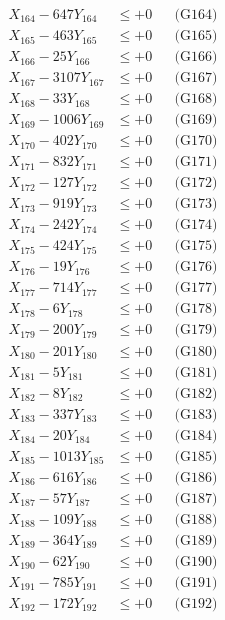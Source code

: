 \documentclass[a4paper,10pt]{article}
\begin{document}
{\begin{align}
X_{164} - 647Y_{164} &\leq +0 && \text{(G164)} \\
X_{165} - 463Y_{165} &\leq +0 && \text{(G165)} \\
X_{166} - 25Y_{166} &\leq +0 && \text{(G166)} \\
X_{167} - 3107Y_{167} &\leq +0 && \text{(G167)} \\
X_{168} - 33Y_{168} &\leq +0 && \text{(G168)} \\
X_{169} - 1006Y_{169} &\leq +0 && \text{(G169)} \\
X_{170} - 402Y_{170} &\leq +0 && \text{(G170)} \\
\allowbreak
X_{171} - 832Y_{171} &\leq +0 && \text{(G171)} \\
X_{172} - 127Y_{172} &\leq +0 && \text{(G172)} \\
X_{173} - 919Y_{173} &\leq +0 && \text{(G173)} \\
X_{174} - 242Y_{174} &\leq +0 && \text{(G174)} \\
X_{175} - 424Y_{175} &\leq +0 && \text{(G175)} \\
X_{176} - 19Y_{176} &\leq +0 && \text{(G176)} \\
X_{177} - 714Y_{177} &\leq +0 && \text{(G177)} \\
X_{178} - 6Y_{178} &\leq +0 && \text{(G178)} \\
X_{179} - 200Y_{179} &\leq +0 && \text{(G179)} \\
X_{180} - 201Y_{180} &\leq +0 && \text{(G180)} \\
\allowbreak
X_{181} - 5Y_{181} &\leq +0 && \text{(G181)} \\
X_{182} - 8Y_{182} &\leq +0 && \text{(G182)} \\
X_{183} - 337Y_{183} &\leq +0 && \text{(G183)} \\
X_{184} - 20Y_{184} &\leq +0 && \text{(G184)} \\
X_{185} - 1013Y_{185} &\leq +0 && \text{(G185)} \\
X_{186} - 616Y_{186} &\leq +0 && \text{(G186)} \\
X_{187} - 57Y_{187} &\leq +0 && \text{(G187)} \\
X_{188} - 109Y_{188} &\leq +0 && \text{(G188)} \\
X_{189} - 364Y_{189} &\leq +0 && \text{(G189)} \\
X_{190} - 62Y_{190} &\leq +0 && \text{(G190)} \\
\allowbreak
X_{191} - 785Y_{191} &\leq +0 && \text{(G191)} \\
X_{192} - 172Y_{192} &\leq +0 && \text{(G192)} \\

\end{align}}
\end{document}
